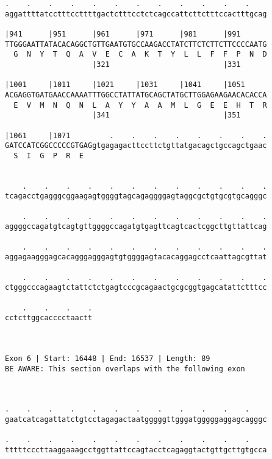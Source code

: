 \documentclass{article}
\begin{document}
\begin{Verbatim}
.    .    .    .    .    .    .    .    .    .    .    .    
aggattttatcctttccttttgactctttcctctcagccattcttctttccactttgcag
                                                            
|941      |951      |961      |971      |981      |991      
TTGGGAATTATACACAGGCTGTTGAATGTGCCAAGACCTATCTTCTCTTCTTCCCCAATG
  G  N  Y  T  Q  A  V  E  C  A  K  T  Y  L  L  F  F  P  N  D
                    |321                          |331      
  
|1001     |1011     |1021     |1031     |1041     |1051     
ACGAGGTGATGAACCAAAATTTGGCCTATTATGCAGCTATGCTTGGAGAAGAACACACCA
  E  V  M  N  Q  N  L  A  Y  Y  A  A  M  L  G  E  E  H  T  R
                    |341                          |351      
  
|1061     |1071         .    .    .    .    .    .    .    .
GATCCATCGGCCCCCGTGAGgtgagagacttccttctgttatgacagctgccagctgaac
  S  I  G  P  R  E                                          
                                                            
  
    .    .    .    .    .    .    .    .    .    .    .    .
tcagacctgagggcggaagagtggggtagcagaggggagtaggcgctgtgcgtgcagggc
                                                            
    .    .    .    .    .    .    .    .    .    .    .    .
aggggccagatgtcagtgttggggccagatgtgagttcagtcactcggcttgttattcag
                                                            
    .    .    .    .    .    .    .    .    .    .    .    .
aggagaagggagcacagggagggagtgtggggagtacacaggagcctcaattagcgttat
                                                            
    .    .    .    .    .    .    .    .    .    .    .    .
ctgggcccagaagtctattctctgagtcccgcagaactgcgcggtgagcatattctttcc
                                                            
    .    .    .    .
cctcttggcacccctaactt
                    
                    
 
Exon 6 | Start: 16448 | End: 16537 | Length: 89
BE AWARE: This section overlaps with the following exon



.    .    .    .    .    .    .    .    .    .    .    .    
gaatcatcagattatctgtcctagagactaatgggggttgggatgggggaggagcagggc
                                                            
.    .    .    .    .    .    .    .    .    .    .    .    
tttttcccttaaggaaagcctggttattccagtacctcagaggtactgttgcttgtgcca
                                                            

\end{Verbatim}
\end{document}
